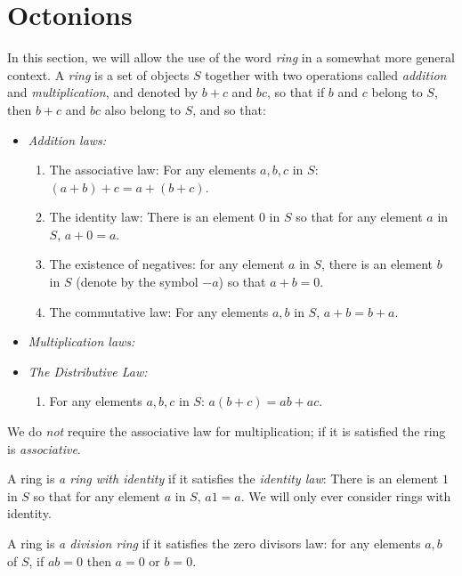 \section{Octonions}
In this section, we will allow the use of the word \emph{ring} in a somewhat more general context.
A \emph{ring} is a set of objects \(S\) together with two operations called \emph{addition} and \emph{multiplication}, and denoted by \(b+c\) and \(bc\), so that if \(b\) and \(c\) belong to \(S\), then \(b+c\) and \(bc\) also belong to \(S\), and so that:
\smallskip
\begin{itemize}
\item[]\emph{Addition laws:}
\begin{enumerate}
\item The associative law: For any elements \(a, b, c\) in \(S\): \((a+b)+c=a+(b+c)\).
\item The identity law: There is an element \(0\) in \(S\) so that for any element \(a\) in \(S\), \(a+0=a\).
\item The existence of negatives: for any element \(a\) in \(S\), there is an element \(b\) in \(S\) (denote by the symbol \(-a\)) so that \(a+b=0\).
\item The commutative law: For any elements \(a, b\) in \(S\), \(a+b=b+a\).
\end{enumerate}
\smallskip
\item[]\emph{Multiplication laws:}
\item[]\emph{The Distributive Law:}
\begin{enumerate}
\item For any elements \(a, b, c\) in \(S\): \(a(b+c)=ab+ac\).
\end{enumerate}
\end{itemize}
We do \emph{not} require the associative law for multiplication; if it is satisfied the ring is \emph{associative}.

A ring is \emph{a ring with identity} if it satisfies
the \emph{identity law}: There is an element \(1\) in \(S\) so that for any element \(a\) in \(S\), \(a1=a\).
We will only ever consider rings with identity.

A ring is \emph{a division ring} if it satisfies the zero divisors law: for any elements \(a, b\) of \(S\), if \(ab=0\) then \(a=0\) or \(b=0\).

